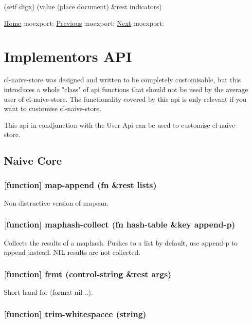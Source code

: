 \documentclass[11pt]{article}
\begin{document}
(setf digx) (value (place document) \&rest indicators)

\href{home.org}{Home} :noexport: \href{examples.org}{Previous} :noexport: \href{implementor-api.org}{Next} :noexport:
\section{Implementors API}
\label{sec:orgc804869}

cl-naive-store was designed and written to be completely customisable,
but this introduces a whole "class" of api functions that should not
be used by the average user of cl-naive-store. The functionality
covered by this api is only relevant if you want to customise
cl-naive-store.

This api in condjunction with the User Api can be used
to customise cl-naive-store.

\subsection{Naive Core}
\label{sec:org6a6722e}

\subsubsection{[function] map-append (fn \&rest lists)}
\label{sec:org508db64}

Non distructive version of mapcan.

\subsubsection{[function] maphash-collect (fn hash-table \&key append-p)}
\label{sec:org37effb9}

Collects the results of a maphash. Pushes to a list by default, use
append-p to append instead. NIL results are not collected.

\subsubsection{[function] frmt (control-string \&rest args)}
\label{sec:org1c42178}

Short hand for (format nil ..).

\subsubsection{[function] trim-whitespacee (string)}
\label{sec:org98488bd}
\end{document}
